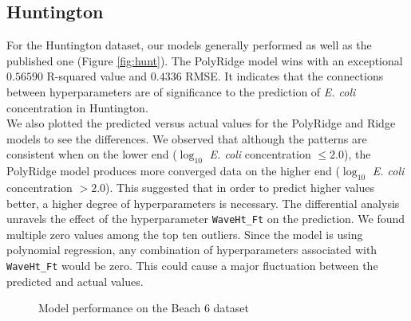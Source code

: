\subsection{Huntington}
For the Huntington dataset, our models generally performed as well as the published one (Figure \ref{fig:hunt}). The PolyRidge model wins with an exceptional $0.56590$ R-squared value and $0.4336$ RMSE. It indicates that the connections between hyperparameters are of significance to the prediction of \textit{E. coli} concentration in Huntington.\\
We also plotted the predicted versus actual values for the PolyRidge and Ridge models to see the differences. We observed that although the patterns are consistent when on the lower end ($\log_{10}$ \textit{E. coli} concentration $\leq 2.0$), the PolyRidge model produces more converged data on the higher end ($\log_{10}$ \textit{E. coli} concentration $> 2.0$). This suggested that in order to predict higher values better, a higher degree of hyperparameters is necessary.
The differential analysis unravels the effect of the hyperparameter \texttt{WaveHt\_Ft} on the prediction. We found multiple zero values among the top ten outliers. Since the model is using polynomial regression, any combination of hyperparameters associated with \texttt{WaveHt\_Ft} would be zero. This could cause a major fluctuation between the predicted and actual values.

\begin{figure}
    \centering
    \caption{Model performance on the Beach 6 dataset}
    \label{fig:b6}
\end{figure}

